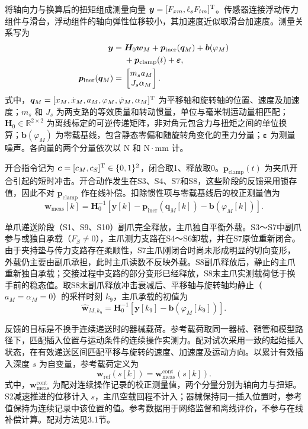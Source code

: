 \documentclass{JQR_LaTeX_Template-0507/JQRnew}
\begin{document}
将轴向力与换算后的扭矩组成测量向量 $\bm y=[F_{xm},\ell_sF_{tm}]^{\rm T}$。传感器连接浮动传力组件与滑台，浮动组件的轴向弹性位移较小，其加速度近似取滑台加速度。测量关系写为
\begin{align}
\label{eq:measurement}
\bm y={}&\bm H_0\bm w_M+\bm p_{\mathrm{iner}}(\bm q_M)
+\bm b(\varphi_M)\notag\\
&+\bm p_{\mathrm{clamp}}(t)+\bm\varepsilon,\\
\label{eq:inertia}
\bm p_{\mathrm{iner}}(\bm q_M)={}&
\begin{bmatrix}m_sa_M\\J_s\alpha_M\end{bmatrix}.
\end{align}
式中，$\bm q_M=[x_M,\dot x_M,a_M,\varphi_M,\dot\varphi_M,\alpha_M]^{\rm T}$ 为平移轴和旋转轴的位置、速度及加速度；$m_s$ 和 $J_s$ 为两支路的等效质量和转动惯量，单位与毫米制运动量相匹配；$\bm H_0\in\mathbb R^{2\times2}$ 为离线标定的可逆传递矩阵，非对角元包含力与扭矩之间的单位换算；$\bm b(\varphi_M)$ 为零载基线，包含静态零偏和随旋转角变化的重力分量；$\bm\varepsilon$ 为测量噪声。各向量的两个分量依次以 $\mathrm{N}$ 和 $\mathrm{N}\cdot\mathrm{mm}$ 计。

开合指令记为 $\bm c=[c_M,c_S]^{\rm T}\in\{0,1\}^2$，闭合取1、释放取0。$\bm p_{\mathrm{clamp}}(t)$ 为夹爪开合引起的短时冲击。开合动作发生在S3、S4、S7和S8，这些阶段的反馈采用锁存值，因此不对 $\bm p_{\mathrm{clamp}}$ 作在线补偿。扣除惯性项与零载基线后的校正测量值为
\begin{equation}
\label{eq:corrected-measurement}
\bm w_{\mathrm{meas}}[k]=\bm H_0^{-1}\!\left[
\bm y[k]-\bm p_{\mathrm{iner}}(\bm q_M[k])-\bm b(\varphi_M[k])\right].
\end{equation}

单爪递送阶段（S1、S9、S10）副爪完全释放，主爪独自平衡外载。S3～S7中副爪参与或独自承载（$F_S\neq0$），主爪测力支路在S4～S6卸载，并在S7原位重新闭合。由于夹持垫与传力支路存在柔顺性，S7主爪刚闭合时尚未形成明显的切向变形，外载仍主要由副爪承担，此时主爪读数不反映外载。S8副爪释放后，静止的主爪重新独自承载；交接过程中支路的部分变形已经释放，S8末主爪实测载荷低于换手前的稳态值。取S8末副爪释放冲击衰减后、平移轴与旋转轴均静止（$a_M=\alpha_M=0$）的采样时刻 $k_9$，主爪承载的初值为
\begin{equation}
\label{eq:initial-load}
\widehat{\bm w}_{M,k_9}
=\bm H_0^{-1}\!\left[\bm y[k_9]-\bm b(\varphi_M[k_9])\right].
\end{equation}

反馈的目标是不换手连续递送时的器械载荷。参考载荷取同一器械、鞘管和模型路径下，匹配插入位置与运动条件的连续操作实测力。配对试次采用一致的起始插入状态，在有效递送区间匹配平移与旋转的速度、加速度及运动方向。以累计有效插入深度 $s$ 为自变量，参考载荷定义为
\begin{equation}
\label{eq:reference}
\bm w_{\mathrm{ref}}(s[k])
=\bm w_{\mathrm{meas}}^{\mathrm{cont}}(s[k]).
\end{equation}
式中，$\bm w_{\mathrm{meas}}^{\mathrm{cont}}$ 为配对连续操作记录的校正测量值，两个分量分别为轴向力与扭矩。S2减速推进的位移计入 $s$，主爪空载回程不计入；器械保持同一插入位置时，参考值保持为连续记录中该位置的值。参考数据用于网络监督和离线评价，不参与在线补偿计算。配对方法见3.1节。
\end{document}
